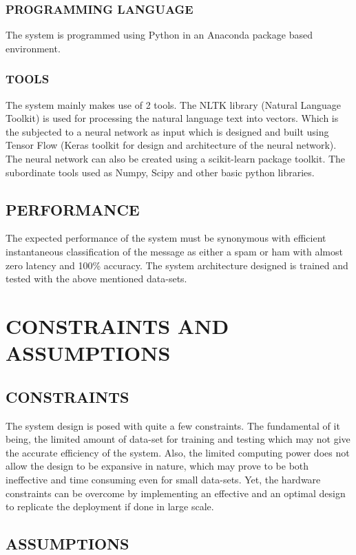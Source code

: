 \subsubsection{PROGRAMMING LANGUAGE} The system is programmed using Python in an Anaconda package based environment.

\subsubsection{TOOLS} The system mainly makes use of 2 tools. The NLTK library (Natural Language Toolkit) is used for processing the natural language text into vectors. Which is the subjected to a neural network as input which is designed and built using Tensor Flow (Keras toolkit for design and architecture of the neural network). The neural network can also be created using a scikit-learn package toolkit. The subordinate tools used as Numpy, Scipy and other basic python libraries. 

\subsection{PERFORMANCE}

The expected performance of the system must be synonymous with efficient instantaneous classification of the message as either a spam or ham with almost zero latency and 100\% accuracy. The system architecture designed is trained and tested with the above mentioned data-sets.

\section{CONSTRAINTS AND ASSUMPTIONS}
\subsection{CONSTRAINTS}

The system design is posed with quite a few constraints. The fundamental of it being, the limited amount of data-set for training and testing which may not give the accurate efficiency of the system. Also, the limited computing power does not allow the design to be expansive in nature, which may prove to be both ineffective and time consuming even for small data-sets. Yet, the hardware constraints can be overcome by implementing an effective and an optimal design to replicate the deployment if done in large scale.    

\subsection{ASSUMPTIONS}

